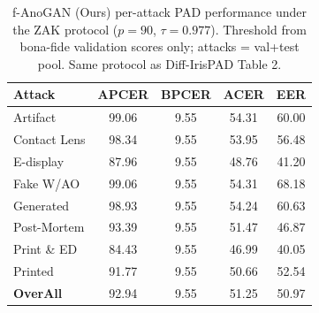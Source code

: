 \begin{table}[t]
\centering
\small
\caption{f-AnoGAN (Ours) per-attack PAD performance under the ZAK protocol ($p{=}90$, $\tau{=}0.977$). Threshold from bona-fide validation scores only; attacks = val+test pool. Same protocol as Diff-IrisPAD Table 2.}
\label{tab:fanogan_zak}
\begin{tabular}{lcccc}
\toprule
Attack & APCER & BPCER & ACER & EER \\
\midrule
Artifact & 99.06 & 9.55 & 54.31 & 60.00 \\
Contact Lens & 98.34 & 9.55 & 53.95 & 56.48 \\
E-display & 87.96 & 9.55 & 48.76 & 41.20 \\
Fake W/AO & 99.06 & 9.55 & 54.31 & 68.18 \\
Generated & 98.93 & 9.55 & 54.24 & 60.63 \\
Post-Mortem & 93.39 & 9.55 & 51.47 & 46.87 \\
Print \& ED & 84.43 & 9.55 & 46.99 & 40.05 \\
Printed & 91.77 & 9.55 & 50.66 & 52.54 \\
\midrule
\textbf{OverAll} & 92.94 & 9.55 & 51.25 & 50.97 \\
\bottomrule
\end{tabular}
\end{table}